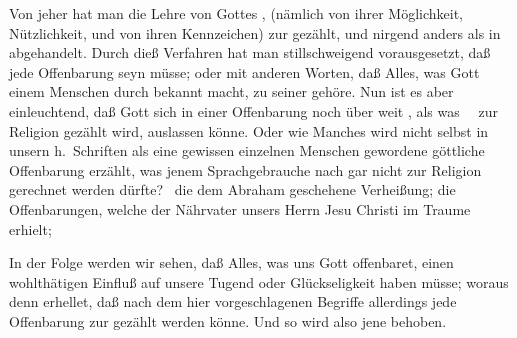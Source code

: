 \begin{aufza}
\begin{aufzb}
\item Von jeher hat man die Lehre von Gottes , (nämlich von ihrer Möglichkeit, Nützlichkeit, und von ihren Kennzeichen) zur  gezählt, und nirgend anders als in  abgehandelt. Durch dieß Verfahren hat man stillschweigend vorausgesetzt, daß jede Offenbarung  seyn müsse; oder mit anderen Worten, daß Alles, was Gott einem Menschen durch  bekannt macht, zu seiner  gehöre. Nun ist es aber einleuchtend, daß Gott sich in einer Offenbarung noch über weit , als was ~\ zur Religion gezählt wird, auslassen könne. Oder wie Manches wird nicht selbst in unsern h.~Schriften als eine gewissen einzelnen Menschen gewordene göttliche Offenbarung erzählt, was jenem Sprachgebrauche nach gar nicht zur Religion gerechnet werden dürfte? \zB\ die dem Abraham geschehene Verheißung; die Offenbarungen, welche der Nährvater unsers Herrn Jesu Christi im Traume erhielt; \udgl\
\end{aufzb}
In der Folge werden wir sehen, daß Alles, was uns Gott offenbaret, einen wohlthätigen Einfluß auf unsere Tugend oder Glückseligkeit haben müsse; woraus denn erhellet, daß nach dem hier vorgeschlagenen Begriffe allerdings jede Offenbarung zur  gezählt werden könne. Und so wird also jene  behoben.

\end{aufza}
